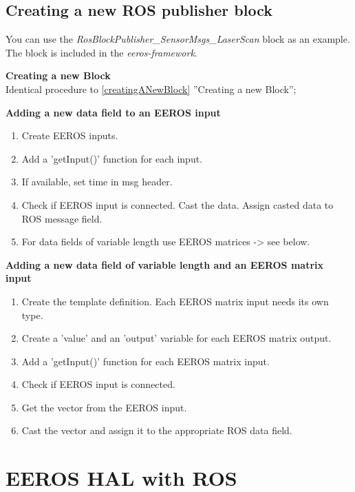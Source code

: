 \subsection{Creating a new ROS publisher block}
You can use the \textit{RosBlockPublisher\_SensorMsgs\_LaserScan} block as an example.
The block is included in the \textit{eeros-framework}.

\textbf{Creating a new Block}\\
Identical procedure to \ref{creatingANewBlock} ''Creating a new Block'';

\textbf{Adding a new data field to an EEROS input}
\begin{enumerate}[\hspace{0.5cm}{B}-1]
\item Create EEROS inputs.
\item Add a 'getInput()' function for each input.
\item If available, set time in msg header.
\item Check if EEROS input is connected. Cast the data. Assign casted data to ROS message field.
\item For data fields of variable length use EEROS matrices -> see below.
\end{enumerate}

\textbf{Adding a new data field of variable length and an EEROS matrix input}
\begin{enumerate}[\hspace{0.5cm}{C}-1]
\item Create the template definition. Each EEROS matrix input needs its own type.
\item Create a 'value' and an 'output' variable for each EEROS matrix output.
\item Add a 'getInput()' function for each EEROS matrix input.
\item Check if EEROS input is connected.
\item Get the vector from the EEROS input.
\item Cast the vector and assign it to the appropriate ROS data field.
\end{enumerate}



\section{EEROS HAL with ROS}
\label{rosHal}
